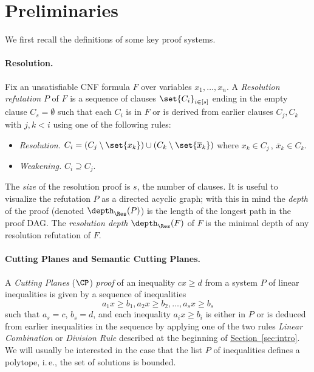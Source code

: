 \documentclass[11pt]{article}
\newcommand{\expref}[2]{\texorpdfstring{\hyperref[#2]{#1~\ref{#2}}}{#1~\ref{#2}}}
\newcommand{\ie}{i.\,e.}
\begin{document}
\section{Preliminaries} 
\label{sec:prelims}
%


We first recall the definitions of some key proof systems.

\paragraph{Resolution.} Fix an unsatisfiable CNF formula $F$ over variables $x_1, \ldots, x_n$. 
A \emph{Resolution refutation} $P$ of $F$ is a sequence of clauses $\set{C_i}_{i \in [s]}$ ending in the empty clause $C_s = \emptyset$ such that each $C_i$ is in $F$ or is derived from earlier clauses $C_j, C_k$ with $j, k < i$ using one of the following rules:
\begin{itemize}
	\item \emph{Resolution.} $C_i = (C_j \setminus \set{x_k}) \cup (C_k \setminus \set{\overline x_k})$ where $x_k \in C_j\,$, $\overline x_k \in C_k$.
	\item \emph{Weakening.} $C_i \supseteq C_j$.
\end{itemize}
The \emph{size} of the resolution proof is $s$, the number of clauses.
It is useful to visualize the refutation $P$ as a directed acyclic graph; with this in mind the \emph{depth} of the proof (denoted $\depth_{\Res}(P)$) is the length of the longest path in the proof DAG.
The \emph{resolution depth} $\depth_{\Res}(F)$ of $F$ is the minimal depth of any resolution refutation of $F$.

\paragraph{Cutting Planes and Semantic Cutting Planes.} A \emph{Cutting Planes} ($\CP$)
\emph{proof} of an inequality $cx \geq d$ from a
%
system $P$ of linear inequalities %
is given by a sequence of inequalities \[ a_1x \geq b_1, a_2x \geq b_2, \ldots, a_s x \geq b_s \]
such that $a_s = c$, $b_s = d$, and each inequality $a_ix \geq b_i$ is either in $P$ or is deduced from earlier inequalities in the sequence by applying one of the two rules \emph{Linear Combination} or \emph{Division Rule} described at the beginning of \expref{Section}{sec:intro}.
We will usually be interested in the case that the
%
list $P$ of inequalities   %
defines a polytope, %
%
\ie, the set of solutions is bounded.  %
%
%
%
\end{document}
